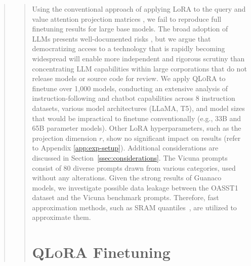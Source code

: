 \begin{quote}
\begin{quote}
{Using the conventional approach of applying LoRA to the query and value attention projection matrices \citep{hu2021lora}, we fail to reproduce full finetuning results for large base models. The broad adoption of LLMs presents well-documented risks \citep{bommasani2021opportunities,bender2021dangers}, but we argue that democratizing access to a technology that is rapidly becoming widespread will enable more independent and rigorous scrutiny than concentrating LLM capabilities within large corporations that do not release models or source code for review. We apply \textsc{QLoRA} to finetune over 1,000 models, conducting an extensive analysis of instruction-following and chatbot capabilities across 8 instruction datasets, various model architectures (LLaMA, T5), and model sizes that would be impractical to finetune conventionally (e.g., 33B and 65B parameter models). Other LoRA hyperparameters, such as the projection dimension $r$, show no significant impact on results (refer to Appendix \ref{app:exp-setup}). Additional considerations are discussed in Section~\ref{ssec:considerations}. The Vicuna prompts consist of 80 diverse prompts drawn from various categories, used without any alterations. Given the strong results of {Guanaco} models, we investigate possible data leakage between the OASST1 dataset and the Vicuna benchmark prompts. Therefore, fast approximation methods, such as SRAM quantiles~\citep{dettmers2022optimizers}, are utilized to approximate them. \section{\textsc{QLoRA} Finetuning}

}
\end{quote}
\end{quote}
